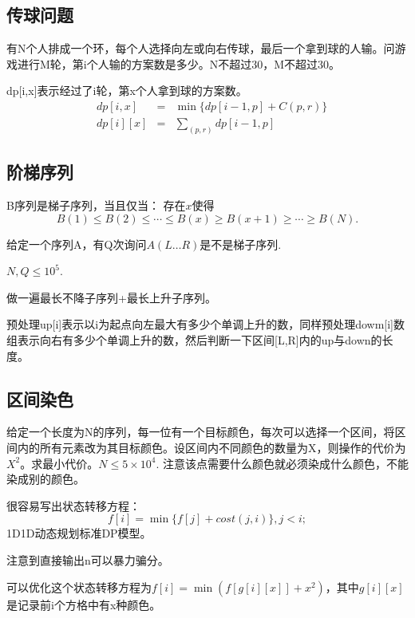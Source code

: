 \documentclass{article}
\begin{document}
\subsection{传球问题}
有N个人排成一个环，每个人选择向左或向右传球，最后一个拿到球的人输。问游戏进行M轮，第i个人输的方案数是多少。N不超过30，M不超过30。

dp[i,x]表示经过了i轮，第x个人拿到球的方案数。
\begin{equation*}
    \begin{aligned}
        &dp[i,x]&=&\min\{dp[i-1,p]+C(p,r)\}\\
        &dp[i][x]&=&\sum_{(p,r)} dp[i-1,p]
    \end{aligned}
\end{equation*}
\subsection{阶梯序列}
B序列是梯子序列，当且仅当：
存在$x$使得
\begin{equation*}
    B(1)\le B(2)\le\cdots\le B(x)\ge B(x+1)\ge\cdots\ge B(N).
\end{equation*}

给定一个序列A，有Q次询问$A(L\ldots R)$是不是梯子序列.

$N,Q\le 10^5$.

做一遍最长不降子序列+最长上升子序列。

预处理up[i]表示以i为起点向左最大有多少个单调上升的数，同样预处理dowm[i]数组表示向右有多少个单调上升的数，然后判断一下区间[L,R]内的up与down的长度。

\subsection{区间染色}
给定一个长度为N的序列，每一位有一个目标颜色，每次可以选择一个区间，将区间内的所有元素改为其目标颜色。设区间内不同颜色的数量为X，则操作的代价为$X^2$。求最小代价。$N\le 5\times 10^4.$ 注意该点需要什么颜色就必须染成什么颜色，不能染成别的颜色。

很容易写出状态转移方程：
\begin{equation*}
    f[i]=\min\{f[j]+cost(j,i)\},j<i;
\end{equation*}
1D1D动态规划标准DP模型。

注意到直接输出n可以暴力骗分。

可以优化这个状态转移方程为$f[i]=\min(f[g[i][x]]+x^2)$，其中$g[i][x]$是记录前i个方格中有x种颜色。
\end{document}

